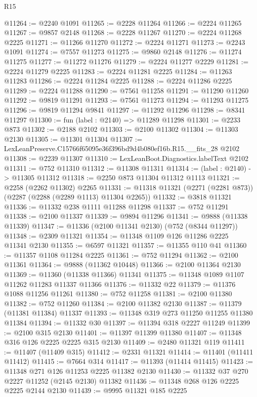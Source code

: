 \begin{lexlean}{R15}
\begin{coremodule}
@11264 := @2240 @1091
@11265 := @2228 @11264
@11266 := @2224 @11265
@11267 := @9857 @2148
@11268 := @2228 @11267
@11270 := @2224 @11268 @2225
@11271 := @11266 @11270
@11272 := @2224 @11271
@11273 := @2243 @1091
@11274 := @7557 @11273
@11275 := @9860 @2148
@11276 := @11274 @11275
@11277 := @11272 @11276
@11279 := @2224 @11277 @2229
@11281 := @2224 @11279 @2225
@11283 := @2224 @11281 @2225
@11284 := @11263 @11283
@11286 := @2224 @11284 @2225
@11288 := @2224 @11286 @2225
@11289 := @2224 @11288
@11290 := @7561 @11258
@11291 := @11290 @11260
@11292 := @9819 @11291
@11293 := @7561 @11273
@11294 := @11293 @11275
@11296 := @9819 @11294 @9841
@11297 := @11292 @11296
@11298 := @8341 @11297
@11300 := fun (label : @2140) => @11289 @11298
@11301 := @2233 @873
@11302 := @2188 @2102
@11303 := @2100 @11302
@11304 := @11303 @2130
@11305 := @11301 @11304
@11307 := LexLeanPreserve.C15766f65095e36f396bd9d4b080ef16b.R15.__fits_28 @2102
@11308 := @2239 @11307
@11310 := LexLeanBoot.Diagnostics.labelText @2102
@11311 := @752 @11310
@11312 := @11308 @11311
@11314 := (label : @2140) -> @11305 @11312
@11318 := @2250 @873 @11304 @11312 @1113
@11321 := @2258 (@2262 @11302) @2265
@11331 := @11318 @11321 (@2271 (@2281 @873)) (@2287 (@2288 (@2289 @1113) @11304 @2265))
@11332 := @3818 @11321
@11336 := @11332 @238 @1111 @11288 @11298
@11337 := @752 @11291
@11338 := @2100 @11337
@11339 := @9894 @11296
@11341 := @9888 (@11338 @11339)
@11347 := @11336 (@2100 @11341 @2130) (@752 (@8344 @11297))
@11348 := @2309 @11321
@11354 := @11348 @1109 @126 @11286 @2225 @11341 @2130
@11355 := @6597 @11321
@11357 := @11355 @110 @41
@11360 := @11357 @1108 @11284 @2225
@11361 := @752 @11294
@11362 := @2100 @11361
@11364 := @9888 (@11362 @10448)
@11366 := @2100 @11364 @2130
@11369 := @11360 (@11338 @11366) @11341
@11375 := @11348 @1089 @1107 @11262 @11283 @11337 @11366
@11376 := @11332 @22
@11379 := @11376 @1088 @11256 @11261
@11380 := @752 @11258
@11381 := @2100 @11380
@11382 := @752 @11260
@11384 := @2100 @11382 @2130
@11387 := @11379 (@11381 @11384) @11337
@11393 := @11348 @319 @273 @11250 @11255 @11380 @11384
@11394 := @11332 @30
@11397 := @11394 @318 @2227 @11249
@11399 := @2100 @315 @2130
@11401 := @11397 @11399 @11380
@11407 := @11348 @316 @126 @2225 @2225 @315 @2130
@11409 := @2480 @11321 @119
@11411 := @11407 (@11409 @315)
@11412 := @2331 @11321
@11414 := @11401 (@11411 @11412)
@11415 := @7664 @314
@11417 := @11393 (@11414 @11415)
@11423 := @11348 @271 @126 @11253 @2225 @11382 @2130
@11430 := @11332 @37 @270 @2227 @11252 (@2145 @2130) @11382
@11436 := @11348 @268 @126 @2225 @2225 @2144 @2130
@11439 := @9995 @11321 @185 @2225

\end{coremodule}
\end{lexlean}
